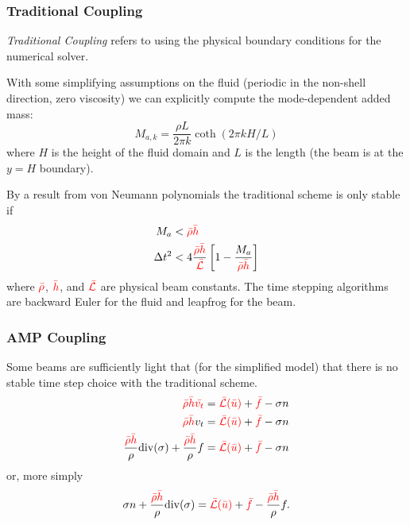 \documentclass[8pt]{beamer}
\newcommand{\leftd}[1]{{\color{red} \bar{#1}}}
\newcommand{\leftdd}[2]{{\color{red} \bar{#1}(\bar{#2})}}
\newcommand{\divergence}{\mathrm{div}}
\begin{document}
\begin{frame}
    \frametitle{Traditional Coupling}
    \emph{Traditional Coupling} refers to using the physical boundary conditions
    for the numerical solver.

    With some simplifying assumptions on the fluid (periodic in the non-shell
    direction, zero viscosity) we can explicitly compute the mode-dependent
    added mass:
    \begin{equation}
        M_{a,k} = \dfrac{\rho L}{2 \pi k} \coth(2 \pi k H / L)
    \end{equation}
    where \(H\) is the height of the fluid domain and \(L\) is the length (the
    beam is at the \(y = H\) boundary).

    \pause
    By a result from von Neumann polynomials the traditional scheme is only
    stable if
    \begin{align}
        M_a &< \leftd{\rho} \leftd{h}                                         \\
        \Delta t^2 &< 4 \dfrac{\leftd{\rho} \leftd{h}}{\leftd{\mathcal{L}}}
        \left[1 - \dfrac{M_a}{\leftd{\rho} \leftd{h}}\right]
    \end{align}
    where \(\leftd{\rho}\), \(\leftd{h}\), and \(\leftd{\mathcal{L}}\) are
    physical beam constants. The time stepping algorithms are backward Euler for
    the fluid and leapfrog for the beam.
\end{frame}

\begin{frame}
    \frametitle{AMP Coupling}
    Some beams are sufficiently light that (for the simplified model) that there
    is no stable time step choice with the traditional scheme.
    \pause
    \begin{align}
        \leftd{\rho} \leftd{h} \leftd{v_t}
        &= \leftdd{\mathcal{L}}{u} + \leftd{f} - \sigma n                     \\
        \leftd{\rho} \leftd{h} v_t
        &= \leftdd{\mathcal{L}}{u} + \leftd{f} - \sigma n                     \\
        \dfrac{\leftd{\rho} \leftd{h}}{\rho} \divergence(\sigma)
        + \dfrac{\leftd{\rho} \leftd{h}}{\rho} f
        &= \leftdd{\mathcal{L}}{u} + \leftd{f} - \sigma n
    \end{align}
    or, more simply
    \begin{equation}
        \sigma n + \dfrac{\leftd{\rho} \leftd{h}}{\rho} \divergence(\sigma)
        = \leftdd{\mathcal{L}}{u}
        + \leftd{f}
        - \dfrac{\leftd{\rho} \leftd{h}}{\rho} f.
    \end{equation}
\end{frame}
\end{document}
